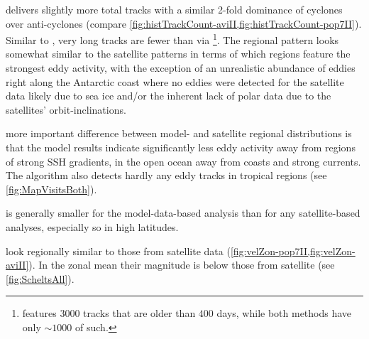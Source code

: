 \renewcommand{\run}[1]{#1-pop7II}
\renewcommand{\RUN}{pop7-\MII: }

 delivers slightly more total tracks with a similar 2-fold dominance of cyclones over anti-cyclones (compare \cref{fig:histTrackCount-aviII,fig:histTrackCount-pop7II}). Similar to \aviII, very long tracks are fewer than via \aviI \footnote{\aviI features $3000$ tracks that are older than $400$ days, while both \MII methods have only $\sim1000$ of such.}. The regional pattern looks somewhat similar to the satellite patterns in terms of which regions feature the strongest eddy activity, with the exception of an unrealistic abundance of eddies right along the Antarctic coast  where no eddies were detected for the satellite data likely due to sea ice and/or the inherent lack of polar data due to the satellites' orbit-inclinations.

 more important difference between model- and satellite regional distributions is that the model results indicate significantly less eddy activity away from regions of strong SSH gradients, in the open ocean away from coasts and strong currents. The algorithm also detects hardly any eddy tracks in tropical regions (see \cref{fig:MapVisitsBoth}).

 is generally smaller for the model-data-based analysis than for any satellite-based analyses, especially so in high latitudes.

 look regionally similar to those from satellite data (\cref{fig:velZon-pop7II,fig:velZon-aviII}). In the zonal mean their magnitude is below those from satellite (see \cref{fig:ScheltsAll}).

